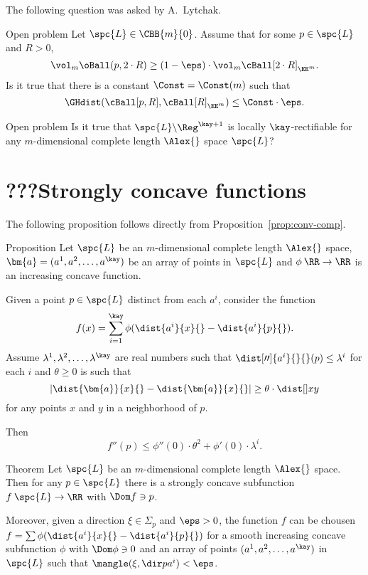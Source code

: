 The following question was asked by A.~Lytchak.

\begin{thm}{Open problem}
Let $\spc{L}\in\CBB{m}{0}$.
Assume that for some $p\in \spc{L}$ and $R>0$,
\[\vol_m\oBall(p,2\cdot R)\ge (1-\eps)\cdot\vol_m\cBall[2\cdot R]_{\EE^m}.\]
Is it true that there is a constant $\Const=\Const(m)$ such that
\[\GHdist(\cBall[p,R],\cBall[R]_{\EE^m})\le \Const\cdot\eps.\]
\end{thm}

\begin{thm}{Open problem}
Is it true that $\spc{L}\backslash\Reg^{\kay+1}$ 
is locally $\kay$-rectifiable for any $m$-dimensional complete length $\Alex{}$ space $\spc{L}$?
\end{thm}


\section{???Strongly concave functions}

The following proposition follows directly from Proposition~\ref{prop:conv-comp}.

\begin{thm}{Proposition}\label{prop:conv-comp-cbb}
Let $\spc{L}$ be an $m$-dimensional complete length $\Alex{}$ space, 
$\bm{a}=(a^1,a^2,\dots,a^\kay)$ be an array of points in $\spc{L}$
and $\phi\:\RR\to\RR$ is an increasing concave function.

Given a point $p\in \spc{L}$ distinct from each $a^i$,
 consider the function
$$f(x)=\sum_{i=1}^\kay\phi(\dist{a^i}{x}{}-\dist{a^i}{p}{}).$$
Assume $\lambda^1,\lambda^2,\dots,\lambda^\kay$ are real numbers such that
$\dist[\prime\prime]{a^i}{}{}(p)\le\lambda^i$ for each $i$
and $\theta\ge 0$ is such that
$$|\dist{\bm{a}}{x}{}-\dist{\bm{a}}{x}{}|
\ge 
\theta\cdot\dist[{{}}]{x}{y}{}$$
for any points $x$ and $y$ in a neighborhood of $p$.

Then 
$$f''(p)\le \phi''(0)\cdot \theta^2+\phi'(0)\cdot\lambda^i.$$

\end{thm}


\begin{thm}{Theorem}\label{thm:concave-thereis}
Let $\spc{L}$ be an $m$-dimensional complete length $\Alex{}$ space.
Then for any $p\in\spc{L}$ there is a strongly concave subfunction $f\: \spc{L}\to\RR$ with
$\Dom f\ni p$.

Moreover, given a direction $\xi\in\Sigma_p$  and $\eps>0$,
the function $f$ can be chousen 
$f=\sum\phi(\dist{a^i}{x}{}-\dist{a^i}{p}{})$
for a smooth increasing concave subfunction $\phi$ with $\Dom \phi\ni0$
and an array of points $(a^1,a^2,\dots,a^\kay)$ in $\spc{L}$
such that $\mangle(\xi,\dir p{a^i})<\eps$. 
\end{thm}

